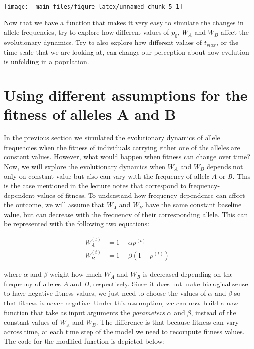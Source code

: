 \documentclass[
]{book}
\begin{document}
\texttt{[image: \_main\_files/figure-latex/unnamed-chunk-5-1]}

Now that we have a function that makes it very easy to simulate the changes in allele frequencies, try to explore how different values of \(p_{0}\), \(W_{A}\) and \(W_{B}\) affect the evolutionary dynamics. Try to also explore how different values of \(t_{max}\), or the time scale that we are looking at, can change our perception about how evolution is unfolding in a population.

\hypertarget{using-different-assumptions-for-the-fitness-of-alleles-a-and-b}{%
\section{Using different assumptions for the fitness of alleles A and B}\label{using-different-assumptions-for-the-fitness-of-alleles-a-and-b}}

In the previous section we simulated the evolutionary dynamics of allele frequencies when the fitness of individuals carrying either one of the alleles are constant values. However, what would happen when fitness can change over time? Now, we will explore the evolutionary dynamics when \(W_{A}\) and \(W_{B}\) depends not only on constant value but also can vary with the frequency of allele \(A\) or \(B\). This is the case mentioned in the lecture notes that correspond to frequency-dependent values of fitness. To understand how frequency-dependence can affect the outcome, we will assume that \(W_{A}\) and \(W_{B}\) have the same constant baseline value, but can decrease with the frequency of their corresponding allele. This can be represented with the following two equations:

\[\begin{align}
W_{A}^{(t)}&=1-\alpha p^{(t)} \\
W_{B}^{(t)}&=1-\beta (1-p^{(t)})
\end{align}\]

where \(\alpha\) and \(\beta\) weight how much \(W_{A}\) and \(W_{B}\) is decreased depending on the frequency of alleles \(A\) and \(B\), respectively. Since it does not make biological sense to have negative fitness values, we just need to choose the values of \(\alpha\) and \(\beta\) so that fitness is never negative. Under this assumption, we can now build a now function that take as input arguments the \emph{parameters} \(\alpha\) and \(\beta\), instead of the constant values of \(W_{A}\) and \(W_{B}\). The difference is that because fitness can vary across time, at each time step of the model we need to recompute fitness values. The code for the modified function is depicted below:
\end{document}

